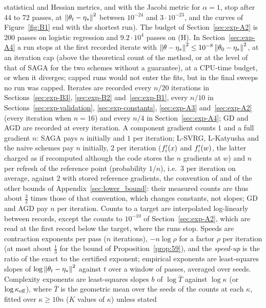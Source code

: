 statistical and Hessian metrics, and with the Jacobi metric for $\alpha=1$, stop after 44 to 72 passes, at
$\left\|\theta_t-\eta_\ast\right\|^2$ between $10^{-24}$ and $3\cdot10^{-23}$, and the curves of Figure~\ref{fig:B1} end with the
shortest run). The budget of Section~\ref{sec:exp-A2} is 200 passes on logistic regression and $9.2\cdot10^4$ passes on
(H). In Section~\ref{sec:exp-A4} a run stops at the first recorded iterate with
$\left\|\theta-\eta_\ast\right\|^2\le10^{-8}\left\|\theta_0-\eta_\ast\right\|^2$, at an iteration cap (above the theoretical count of the
method, or at the level of that of SAGA for the two schemes without a guarantee), at a CPU-time budget, or when it
diverges; capped runs would not enter the fits, but in the final sweeps no run was capped. Iterates are recorded every
$n/20$ iterations in Sections~\ref{sec:exp-B3}, \ref{sec:exp-B2} and~\ref{sec:exp-B1}, every $n/10$ in
Sections~\ref{sec:exp-validation}, \ref{sec:exp-constants}, \ref{sec:exp-A3} and~\ref{sec:exp-A2} (every iteration when
$n=16$) and every $n/4$ in Section~\ref{sec:exp-A4}; GD and AGD are recorded at every iteration. A component gradient
counts $1$ and a full gradient $n$: SAGA pays $n$ initially and $1$ per iteration; L-SVRG, L-Katyusha and the naive
schemes pay $n$ initially, $2$ per iteration ($f'_i(x)$ and $f'_i(w)$, the latter charged as if recomputed although the
code stores the $n$ gradients at $w$) and $n$ per refresh of the reference point (probability $1/n$), i.e.\ $3$ per
iteration on average, against $2$ with stored reference gradients, the convention of  and of the
other bounds of Appendix~\ref{sec:lower_bound}: their measured counts are thus about $\frac32$ times those of that
convention, which changes constants, not slopes; GD and AGD pay $n$ per iteration. Counts to a target are interpolated
log-linearly between records, except the counts to $10^{-10}$ of Section~\ref{sec:exp-A2}, which are read at the first record below the
target, where the runs stop. Speeds are contraction exponents per pass ($n$ iterations), $-n\log\rho$ for
a factor $\rho$ per iteration (at most about $\frac13$ for the bound of Proposition~\ref{prop:59}), and the
\emph{speed-up} is the ratio of the exact to the certified exponent; empirical exponents are least-squares slopes of
$\log\left\|\theta_t-\eta_\ast\right\|^2$ against $t$ over a window of passes, averaged over seeds. Complexity exponents are
least-squares slopes $b$ of $\log\bar T$ against $\log\kappa$ (or $\log\kappa_{\rm eff}$), where $\bar T$ is the geometric
mean over the seeds of the counts at each $\kappa$, fitted over $\kappa\ge10n$ ($K$ values of $\kappa$) unless stated
